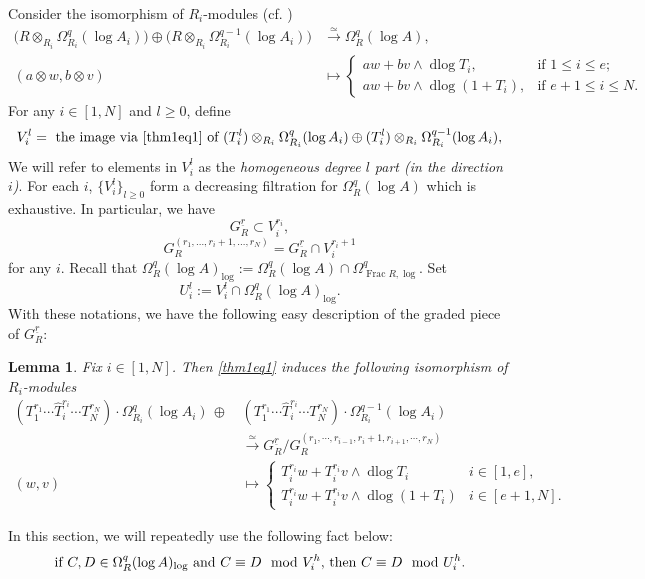 \documentclass[11pt]{amsart}
\newcommand{\eq}[2]{\begin{equation}\label{#1}#2 \end{equation}}
\newcommand{\Frac}{\operatorname{Frac}}
\newcommand{\xra}{\xrightarrow}
\newcommand{\dlog}{\operatorname{dlog}}
\renewcommand{\hat}{\widehat}
\newcommand{\ul}{\underline}
\theoremstyle{plain}
\newtheorem{lem}[prop]{Lemma}
\theoremstyle{definition}
\numberwithin{equation}{prop}
\begin{document}
Consider the isomorphism of $R_i$-modules (cf. \cite[Claim 1.2.4]{JSZ})
\begin{align}\label{thm1eq1}
\Big(
R\otimes_{R_i}\Omega^q_{R_i}(\log A_i)
\Big)
\oplus
\Big(
R\otimes_{R_i}\Omega^{q-1}_{R_i}(\log A_i)
\Big)
&\xra{\simeq} 
\Omega^q_R(\log A),
\\
(a\otimes w, b\otimes v)
&\mapsto
\begin{cases}
aw+bv\wedge \dlog T_i,
&\text{if $1\le i\le e$;}
\\
aw+bv\wedge \dlog (1+T_i),
&\text{if $e+1\le i\le N$.}
\end{cases}
\nonumber
\end{align}
For any $i\in [1,N]$ and $l\ge 0$, define
$$
V_i^l=\text{ the image via \eqref{thm1eq1} of }
(T^l_i) \otimes_{R_i} \Omega^q_{R_i}(\log A_i)
\oplus
(T^l_i) \otimes_{R_i} \Omega^{q-1}_{R_i}(\log A_i),
$$
We will refer to elements in $V_i^l$ as the \textit{homogeneous degree $l$ part (in the direction $i$)}.
For each $i$, $\{V_i^l\}_{l\ge 0}$ form a decreasing filtration for $\Omega^q_{R}(\log A)$ which is exhaustive. 
In particular, we have
\eq{GV1}{G_R^{\ul r}\subset V_i^{r_i},
}
\eq{GV2}{
G^{(r_1, \dots, r_i+1, \dots, r_N)}_R
=G^{\underline{r}}_R \cap V_i^{r_i+1}}
for any $i$.
Recall that $\Omega^q_R(\log A)_{\log}:=
\Omega^q_R(\log A)\cap \Omega^q_{\Frac R,\log}$.
Set
$$ 
U_i^l:=V_i^l\cap \Omega^q_R(\log A)_{\log}.$$
With these notations, we have the following easy description of the graded piece of $G^{\ul r}_{R}$:
\begin{lem}
\label{lem1}
Fix $i\in [1,N]$. 
Then \eqref{thm1eq1} induces the following isomorphism of $R_i$-modules
\begin{align*}
(T_1^{r_1}\cdots\hat T_i^{r_i}\cdots T_N^{r_N})\cdot
\Omega^q_{R_i}(\log A_i)\,\oplus \,
&
(T_1^{r_1}\cdots\hat T_i^{r_i}\cdots T_N^{r_N})\cdot
\Omega^{q-1}_{R_i}(\log A_i)
\\
&
\xra{\simeq} 
G^{\ul r}_{R}/G^{(r_1,\cdots,r_{i-1},
r_i+1,
r_{i+1},\cdots, r_N)}_{R}
\\ 
(w,v)&\mapsto 
\begin{cases}
T_i^{r_i}w+ T_i^{r_i}v\wedge \dlog T_i
&i\in [1,e],
\\
T_i^{r_i}w+T_i^{r_i}v\wedge \dlog (1+T_i)
&
i\in[e+1,N].
\end{cases}
\end{align*}
\end{lem}




In this section, we will repeatedly use the following fact below: 
\eq{modUvsmodV}{\text{\textit{if $C,D\in \Omega^q_R(\log A)_{\log}$ and $C\equiv D\mod V_i^{h}$, then $C\equiv D \mod U_i^{h}$.}}}
\end{document}
